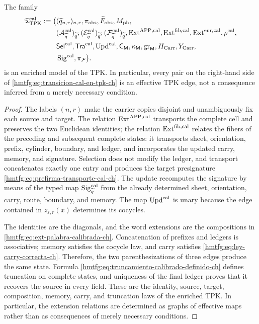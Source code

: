 \begin{proposition}
\label{hmtfg:prop:modelo-tpk-calibrado-ch}
The family
\[
\begin{aligned}
 \mathfrak T_{\rm TPK}^{\rm cal}:=\bigl(
 &(\widetilde q_{n,r})_{n,r},\pi_{\rm obs},
   \widetilde F_{\rm obs},M_{\rm ph},\\
 &(\mathcal A_{\widetilde q}^{\rm cal})_{\widetilde q},
   (\mathcal E_{\widetilde q}^{\rm cal})_{\widetilde q},
   (\mathcal F_{\widetilde q}^{\rm cal})_{\widetilde q},
   \operatorname{Ext}^{\mathrm{APP},\rm cal},
   \operatorname{Ext}^{\rm fib,cal},
   \operatorname{Ext}^{\rm enr,cal},\rho^{\rm cal},\\
 &\mathsf{Sel}^{\rm cal},\mathsf{Tra}^{\rm cal},
   \operatorname{Upd}^{\rm cal},\mathsf C_{\mathsf M},
   \kappa_{\mathsf M},\operatorname{gr}_{\mathsf M},
   H_{\rm Carr},Y_{\rm Carr},\\
 &\operatorname{Sig}^{\rm cal},\pi_{\mathcal F}\bigr).
\end{aligned}
\]
is an enriched model of the TPK. In particular, every pair on the right-hand
side of \eqref{hmtfg:eq:transicion-cal-en-tpk-ch} is an effective TPK edge, not a
consequence inferred from a merely necessary condition.
\end{proposition}

\begin{proof}
The labels \((n,r)\) make the carrier copies disjoint and unambiguously fix
each source and target. The relation \(\operatorname{Ext}^{\mathrm{APP},\rm cal}\)
transports the complete cell and preserves the two Euclidean identities; the
relation \(\operatorname{Ext}^{\rm fib,cal}\) relates the fibers of the
preceding and subsequent complete states: it transports sheet, orientation,
prefix, cylinder, boundary, and ledger, and incorporates the updated carry,
memory, and signature. Selection does not modify the ledger, and transport
concatenates exactly one entry and produces the target presignature
\eqref{hmtfg:eq:prefirma-transporte-cal-ch}. The update recomputes the signature by
means of the typed map \(\operatorname{Sig}^{\rm cal}_{\widetilde q}\) from
the already determined sheet, orientation, carry, route, boundary, and memory.
The map \(\operatorname{Upd}^{\rm cal}\) is unary because the edge contained
in \(z_{\varepsilon,r}(x)\) determines its cocycles.

The identities are the diagonals, and the word extensions are the compositions
in \eqref{hmtfg:eq:ext-palabra-calibrada-ch}. Concatenation of prefixes and ledgers
is associative; memory satisfies the cocycle law, and carry satisfies
\eqref{hmtfg:eq:ley-carry-correcta-ch}. Therefore, the two parenthesizations of three
edges produce the same state. Formula
\eqref{hmtfg:eq:truncamiento-calibrado-definido-ch} defines truncation on complete
states, and uniqueness of the final ledger proves that it recovers the source
in every field. These are the identity, source, target, composition, memory,
carry, and truncation laws of the enriched TPK. In particular, the extension
relations are determined as graphs of effective maps rather than as
consequences of merely necessary conditions.
\end{proof}

